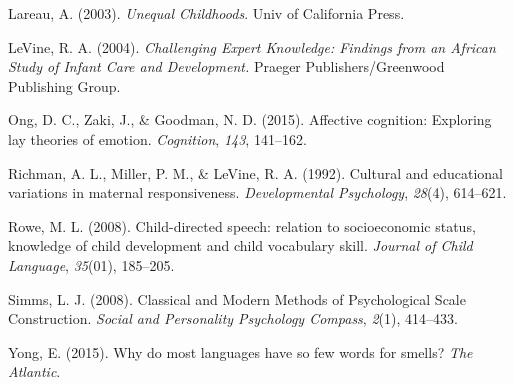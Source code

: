 \documentclass[10pt, letterpaper]{article}
\begin{document}
Lareau, A. (2003). \emph{Unequal Childhoods}. Univ of California Press.

LeVine, R. A. (2004). \emph{Challenging Expert Knowledge: Findings from
an African Study of Infant Care and Development.} Praeger
Publishers/Greenwood Publishing Group.

Ong, D. C., Zaki, J., \& Goodman, N. D. (2015). Affective cognition:
Exploring lay theories of emotion. \emph{Cognition}, \emph{143},
141--162.

Richman, A. L., Miller, P. M., \& LeVine, R. A. (1992). Cultural and
educational variations in maternal responsiveness. \emph{Developmental
Psychology}, \emph{28}(4), 614--621.

Rowe, M. L. (2008). Child-directed speech: relation to socioeconomic
status, knowledge of child development and child vocabulary skill.
\emph{Journal of Child Language}, \emph{35}(01), 185--205.

Simms, L. J. (2008). Classical and Modern Methods of Psychological Scale
Construction. \emph{Social and Personality Psychology Compass},
\emph{2}(1), 414--433.

Yong, E. (2015). Why do most languages have so few words for smells?
\emph{The Atlantic}.
\end{document}
